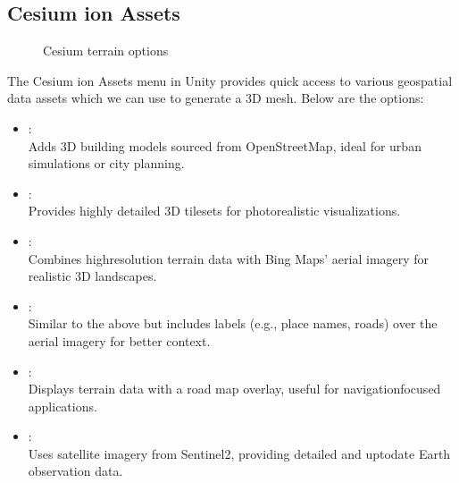 \documentclass[letterpaper,10pt,english]{jupyterBook}
\begin{document}
\subsection{Cesium ion Assets}
\label{\detokenize{Cesium:cesium-ion-assets}}
\begin{figure}[htbp]
\centering
\capstart

\noindent{}
\caption{Cesium terrain options}\label{\detokenize{Cesium:ion-assets}}\end{figure}

\sphinxAtStartPar
The Cesium ion Assets menu in Unity provides quick access to various geospatial data assets which we can use to generate a 3D mesh. Below are the options:
\begin{itemize}
\item {} 
\sphinxAtStartPar
{}:\\
Adds 3D building models sourced from OpenStreetMap, ideal for urban simulations or city planning.

\item {} 
\sphinxAtStartPar
{}:\\
Provides highly detailed 3D tilesets for photorealistic visualizations.

\item {} 
\sphinxAtStartPar
{}:\\
Combines high\sphinxhyphen{}resolution terrain data with Bing Maps’ aerial imagery for realistic 3D landscapes.

\item {} 
\sphinxAtStartPar
{}:\\
Similar to the above but includes labels (e.g., place names, roads) over the aerial imagery for better context.

\item {} 
\sphinxAtStartPar
{}:\\
Displays terrain data with a road map overlay, useful for navigation\sphinxhyphen{}focused applications.

\item {} 
\sphinxAtStartPar
{}:\\
Uses satellite imagery from Sentinel\sphinxhyphen{}2, providing detailed and up\sphinxhyphen{}to\sphinxhyphen{}date Earth observation data.

\end{itemize}
\end{document}
